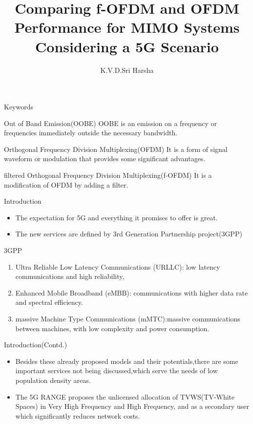 \documentclass{beamer}
\title{Comparing f-OFDM and OFDM Performance for
MIMO Systems Considering a 5G Scenario}
\author[CS20BTECH11028]{K.V.D.Sri Harsha}
\institute[IITH]{Indian Institute of Technology,Hyderabad}
\date{}
\begin{document}
\begin{frame}
\titlepage
\end{frame}
 \begin{frame}{Keywords}
     \begin{block}{Out of Band Emission(OOBE)}
     OOBE is an emission on a frequency or frequencies immediately outside the necessary bandwidth.
     \end{block}
     \begin{block}{Orthogonal Frequency Division Multiplexing(OFDM)}
     It is a form of signal waveform or modulation that provides some significant advantages.
     \end{block}
     \begin{block}{filtered Orthogonal Frequency Division Multiplexing(f-OFDM)}
     It is a modification of OFDM by adding a filter.
     \end{block}
 \end{frame}
 \begin{frame}{Introduction}
   \begin{itemize}
    \item The expectation for 5G and everything it promises to offer is great.
    \item The new services are defined by 3rd Generation Partnership project(3GPP)
\end{itemize}
\begin{block}{3GPP}
\begin{enumerate}
    \item Ultra Reliable Low Latency Communications (URLLC): low latency communications and high reliability,
    \item Enhanced Mobile Broadband (eMBB): communications with higher data rate and spectral efficiency.
    \item massive Machine Type Communications (mMTC):massive communications between machines, with low complexity and power consumption.
\end{enumerate}
\end{block}
\end{frame}
\begin{frame}{Introduction(Contd.)}
    \begin{itemize}
        \item Besides these already proposed models and their potentials,there are some important services not being discussed,which serve the needs of low population density areas.
        \item The 5G RANGE proposes the unlicensed allocation of TVWS(TV-White Spaces) in Very High Frequency and High Frequency, and as a secondary user which significantly reduces network costs.
    \end{itemize}
\end{frame}
\end{document}
